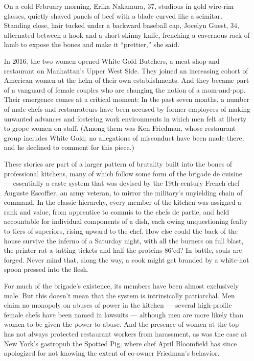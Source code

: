 On a cold February morning, Erika Nakamura, 37, studious in gold
wire-rim glasses, quietly shaved panels of beef with a blade curved like
a scimitar. Standing close, hair tucked under a backward baseball cap,
Jocelyn Guest, 34, alternated between a hook and a short skinny knife,
frenching a cavernous rack of lamb to expose the bones and make it
``prettier,'' she said.

In 2016, the two women opened White Gold Butchers, a meat shop and
restaurant on Manhattan's Upper West Side. They joined an increasing
cohort of American women at the helm of their own establishments. And
they became part of a vanguard of female couples who are changing the
notion of a mom-and-pop. Their emergence comes at a critical moment: In
the past seven months, a number of male chefs and restaurateurs have
been accused by former employees of making unwanted advances and
fostering work environments in which men felt at liberty to grope women
on staff. (Among them was Ken Friedman, whose restaurant group includes
White Gold; no allegations of misconduct have been made there, and he
declined to comment for this piece.)

These stories are part of a larger pattern of brutality built into the
bones of professional kitchens, many of which follow some form of the
brigade de cuisine --- essentially a caste system that was devised by
the 19th-century French chef Auguste Escoffier, an army veteran, to
mirror the military's unyielding chain of command. In the classic
hierarchy, every member of the kitchen was assigned a rank and value,
from apprentice to commis to the chefs de partie, and held accountable
for individual components of a dish, each owing unquestioning fealty to
tiers of superiors, rising upward to the chef. How else could the back
of the house survive the inferno of a Saturday night, with all the
burners on full blast, the printer rat-a-tatting tickets and half the
proteins 86'ed? In battle, souls are forged. Never mind that, along the
way, a cook might get branded by a white-hot spoon pressed into the
flesh.

For much of the brigade's existence, its members have been almost
exclusively male. But this doesn't mean that the system is intrinsically
patriarchal. Men claim no monopoly on abuses of power in the kitchen ---
several high-profile female chefs have been named in lawsuits ---
although men are more likely than women to be given the power to abuse.
And the presence of women at the top has not always protected restaurant
workers from harassment, as was the case at New York's gastropub the
Spotted Pig, where chef April Bloomfield has since apologized for not
knowing the extent of co-owner Friedman's behavior.

